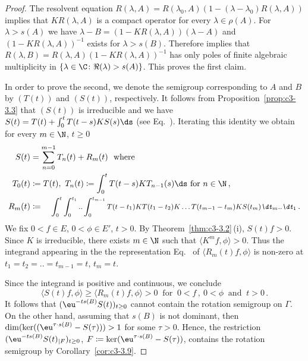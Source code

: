\begin{proof}
The resolvent equation $R(\lambda,A) = R(\lambda_{0},A)(1 - (\lambda-\lambda_{0})R(\lambda,A))$ implies that $KR(\lambda,A)$ is a compact operator for every $\lambda \in \rho(A)$. 
For $\lambda > s(A)$ we have $\lambda - B = (1 - KR(\lambda,A))(\lambda-A)$ and $(1 - KR(\lambda,A))^{-1}$ exists for $\lambda > s(B)$.
Therefore \textcite[Theorem XIII.13]{reedsimon:1979} 
implies that $R(\lambda,B) = R(\lambda,A)(1 - KR(\lambda,A))^{-1}$ has only poles of finite algebraic multiplicity in $\{\lambda \in \C  \colon \Re(\lambda) > s(A)\}$. 
This proves the first claim.

In order to prove the second, we denote the semigroup corresponding to $A$ and $B$ by $(T(t))$ and $(S(t))$,  respectively.
It follows from Proposition~\ref{prop:c3-3.3} that $(S(t))$ is irreducible and we have $S(t) = T(t) + \int_{0}^{t} T(t-s)KS(s)\ds$ (see Eq.~). 
Iterating this identity we obtain for every $m \in \N$, $t \geq 0$
\begin{equation}\label{eq:c3-3.21}
\begin{split}
    S(t) &= \sum_{n=0}^{m-1} T_{n}(t) + R_{m}(t) \ \text{ where}\\ 
    T_{0}(t)&\coloneqq T(t),\  T_{n}(t) \coloneqq  \int_{0}^{t} T(t-s)KT_{n-1}(s)\ds \text{ for } n \in \N\,,\\
    R_{m}(t) &\coloneqq \textit{\small $\int_{0}^{t}\int_{0}^{t_{1}} .. \int_{0}^{t_{m-1}} T(t-t_{1})KT(t_{1}-t_{2})K \ldots T(t_{m-1}-t_m)KS(t_{m})\dt _{m}..\dt _{1}$}\,.
\end{split}
\end{equation}
We fix $0 < f \in E$, $0 < \phi \in E'$, $t > 0$. 
By Theorem~\ref{thm:c3-3.2}\,(i), $S(t)f > 0$.
Since $K$ is irreducible, there exists $m \in \N$ such that $\langle K^{m}f,\phi\rangle > 0$. 
Thus the integrand appearing in the the representation Eq.~ of\/ $\langle R_{m}(t)f,\phi\rangle$ is non-zero at $t_{1}=t_{2}= .. =t_{m-1}=t$, $t_{m}= t$.

Since the integrand is positive and continuous, we conclude
\begin{equation}\label{eq:c3-3.22}%
    \langle S(t)f,\phi\rangle \geq \langle R_{m}(t)f,\phi\rangle > 0 \ \text{ for } \ 0 < f \,,  \ 0 < \phi \ \text{ and } \ t > 0\,.
\end{equation}
It follows that $(\eu^{-ts(B)}S(t))_{t \geq 0}$ cannot contain the rotation semigroup on $\Gamma$. 
On the other hand, assuming that $s(B)$ is not dominant, then $\dim(\ker((\eu^{\tau\cdot s(B)} - S(\tau))) > 1$ for some $\tau > 0$. 
Hence, the restriction $(\eu^{-ts(B)}S(t)_{|F})_{t \geq 0}$, $F \coloneqq  \ker(\eu^{\tau\cdot s(B)}- S(\tau))$, contains the rotation semigroup by Corollary~\ref{cor:c3-3.9}.
\end{proof}

